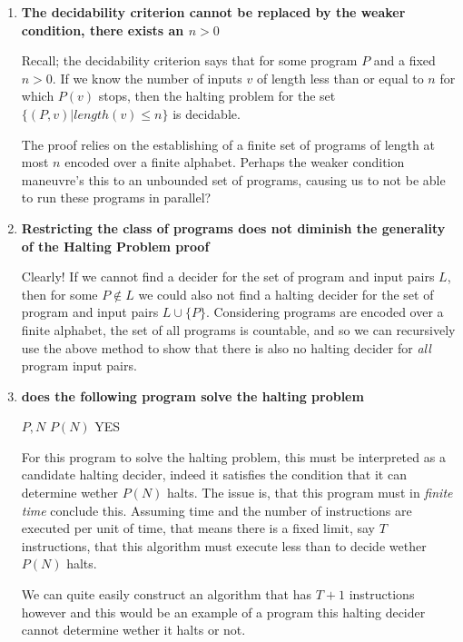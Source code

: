\documentclass{article}
\newenvironment{answered}{\par\normalfont}{}
\begin{document}
\begin{enumerate}
\item{\textbf{The decidability criterion cannot be replaced by the weaker condition, there exists an $n > 0$}}

	\begin{answered}
		Recall; the decidability criterion says that for some program $P$ and a fixed $n > 0$. If we know the number of inputs $v$ of length less than or equal to $n$ for which $P(v)$ stops, then the halting problem for the set $\{(P,v) | length(v) \leq n \}$ is decidable.

		The proof relies on the establishing of a finite set of programs of length at most $n$ encoded over a finite alphabet. Perhaps the weaker condition maneuvre's this to an unbounded set of programs, causing us to not be able to run these programs in parallel?
	\end{answered}

\item{\textbf{Restricting the class of programs does not diminish the generality of the Halting Problem proof}}

	\begin{answered}
		Clearly! If we cannot find a decider for the set of program and input pairs $L$, then for some $P \not\in L$ we could also not find a halting decider for the set of program and input pairs $L \cup \{P\}$. Considering programs are encoded over a finite alphabet, the set of all programs is countable, and so we can recursively use the above method to show that there is also no halting decider for \emph{all} program input pairs.
	\end{answered}

\item{\textbf{does the following program solve the halting problem}}
	\begin{answered}
		\begin{algorithmic}[1]
	\REQUIRE $P, N$
	\STATE $P(N)$
	\RETURN YES
\end{algorithmic}
For this program to solve the halting problem, this must be interpreted as a candidate halting decider, indeed it satisfies the condition that it can determine wether $P(N)$ halts. The issue is, that this program must in \emph{finite time} conclude this. Assuming time and the number of instructions are executed per unit of time, that means there is a fixed limit, say $T$ instructions, that this algorithm must execute less than to decide wether $P(N)$ halts.

We can quite easily construct an algorithm that has $T+1$ instructions however and this would be an example of a program this halting decider cannot determine wether it halts or not. 
	\end{answered}
\end{enumerate}
\end{document}
